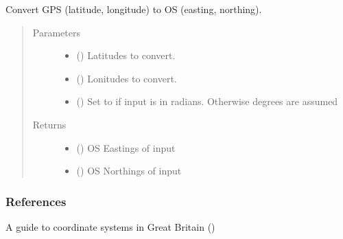 \documentclass[letterpaper,10pt,english]{sphinxmanual}
\begin{document}
\begin{fulllineitems}
\label{\detokenize{index:flood_tool.get_easting_northing_from_lat_long}}
Convert GPS (latitude, longitude) to OS (easting, northing).
\begin{quote}\begin{description}
\item[{Parameters}] \leavevmode\begin{itemize}
\item {} 
 () \textendash{} Latitudes to convert.

\item {} 
 () \textendash{} Lonitudes to convert.

\item {} 
 (\sphinxstyleliteralemphasis{\sphinxupquote{, }}) \textendash{} Set to  if input is in radians. Otherwise degrees are assumed

\end{itemize}

\item[{Returns}] \leavevmode
\begin{itemize}
\item {} 
 () \textendash{} OS Eastings of input

\item {} 
 () \textendash{} OS Northings of input

\end{itemize}


\end{description}\end{quote}
\subsubsection*{References}

A guide to coordinate systems in Great Britain
()

\end{fulllineitems}
\end{document}
